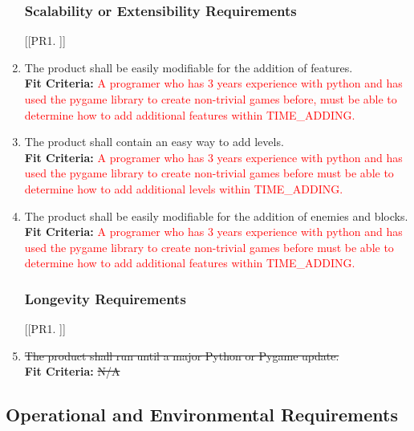 \documentclass[12pt, titlepage]{article}
\begin{document}
\begin{enumerate}[{PR}1. ]
\subsubsection{Scalability or Extensibility Requirements}
[{[{PR}1. ]}]
    \item The product shall be easily modifiable for the addition of features.\\
    \textbf{Fit Criteria:} \textcolor{red}{A programer who has 3 years experience with python and has used the pygame library to create non-trivial games before, must be able to determine how to add additional features within TIME\_ADDING.}
    \item The product shall contain an easy way to add levels.\\
    \textbf{Fit Criteria:} \textcolor{red}{A programer who has 3 years experience with python and has used the pygame library to create non-trivial games before must be able to determine how to add additional levels within TIME\_ADDING.}
    \item The product shall be easily modifiable for the addition of enemies and blocks.\\
    \textbf{Fit Criteria:} \textcolor{red}{A programer who has 3 years experience with python and has used the pygame library to create non-trivial games before must be able to determine how to add additional features within TIME\_ADDING.}

\subsubsection{Longevity Requirements}
[{[{PR}1. ]}]
    \item \sout{The product shall run until a major Python or Pygame update.}\\
    \textbf{Fit Criteria:} \sout{N/A}
\end{enumerate}



\subsection{Operational and Environmental Requirements}
\end{document}
